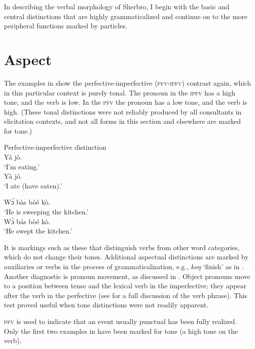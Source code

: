 In describing the verbal morphology of Sherbro, I begin with the basic and central distinctions that are highly grammaticalized and continue on to the more peripheral functions marked by particles.

\section{Aspect}
\label{sec:4.1}\hypertarget{Toc115517782}{}
The examples in  show the perfective-imperfective (\textsc{pfv}{}-\textsc{ipfv}) contrast again, which in this particular context is purely tonal. The pronoun in the \textsc{ipfv} has a high tone, and the verb is low. In the \textsc{pfv} the pronoun has a low tone, and the verb is high. (These tonal distinctions were not reliably produced by all consultants in elicitation contexts, and not all forms in this section and elsewhere are marked for tone.)

\ea \label{ex:110}
Perfective-imperfective distinction\\
\ea 
\ea Yá jò.\\   
‘I'm eating.'\\                

\ex Yà jó.\\
‘I ate (have eaten).'\\
\z
   
\ex 
\ea Wɔ́ bàs bòé kò.\\
‘He is sweeping the kitchen.'\\
   
\ex Wɔ̀ bás bòé kò.\\
‘He swept the kitchen.'
\z
\z
\z

It is markings such as these that distinguish verbs from other word categories, which do not change their tones. Additional aspectual distinctions are marked by auxiliaries or verbs in the process of grammaticalization, e.g., \textit{koŋ} ‘finish' as in . Another diagnostic is pronoun movement, as discussed in . Object pronouns move to a position between tense and the lexical verb in the imperfective; they appear after the verb in the perfective (see  for a full discussion of the verb phrase). This test proved useful when tone distinctions were not readily apparent.

\textsc{pfv} is used to indicate that an event usually punctual has been fully realized. Only the first two examples in  have been marked for tone (a high tone on the verb).

